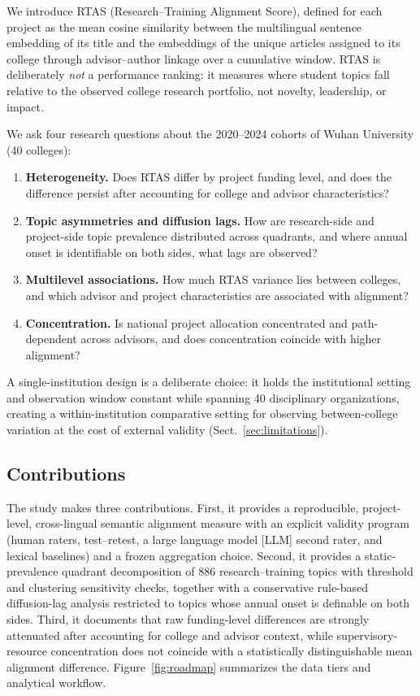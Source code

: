 \documentclass[11pt]{article}
\begin{document}
We introduce RTAS (Research--Training Alignment Score), defined for each project as the mean cosine similarity between the multilingual sentence embedding of its title and the embeddings of the unique articles assigned to its college through advisor--author linkage over a cumulative window. RTAS is deliberately \emph{not} a performance ranking: it measures where student topics fall relative to the observed college research portfolio, not novelty, leadership, or impact.

We ask four research questions about the 2020--2024 cohorts of Wuhan University (40 colleges):
\begin{enumerate}[label=\textbf{RQ\arabic*.}]
\item \textbf{Heterogeneity.} Does RTAS differ by project funding level, and does the difference persist after accounting for college and advisor characteristics?
\item \textbf{Topic asymmetries and diffusion lags.} How are research-side and project-side topic prevalence distributed across quadrants, and where annual onset is identifiable on both sides, what lags are observed?
\item \textbf{Multilevel associations.} How much RTAS variance lies between colleges, and which advisor and project characteristics are associated with alignment?
\item \textbf{Concentration.} Is national project allocation concentrated and path-dependent across advisors, and does concentration coincide with higher alignment?
\end{enumerate}

A single-institution design is a deliberate choice: it holds the institutional setting and observation window constant while spanning 40 disciplinary organizations, creating a within-institution comparative setting for observing between-college variation at the cost of external validity (Sect.~\ref{sec:limitations}).

\subsection{Contributions}

The study makes three contributions. First, it provides a reproducible, project-level, cross-lingual semantic alignment measure with an explicit validity program (human raters, test--retest, a large language model [LLM] second rater, and lexical baselines) and a frozen aggregation choice. Second, it provides a static-prevalence quadrant decomposition of 886 research--training topics with threshold and clustering sensitivity checks, together with a conservative rule-based diffusion-lag analysis restricted to topics whose annual onset is definable on both sides. Third, it documents that raw funding-level differences are strongly attenuated after accounting for college and advisor context, while supervisory-resource concentration does not coincide with a statistically distinguishable mean alignment difference. Figure~\ref{fig:roadmap} summarizes the data tiers and analytical workflow.
\end{document}
